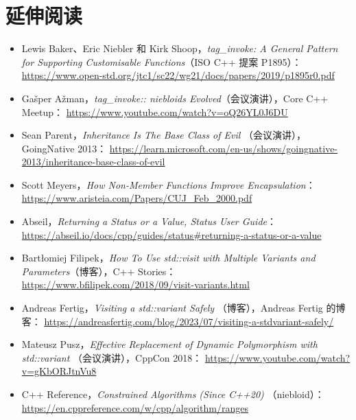 \section{延伸阅读}

\begin{itemize}
\item Lewis Baker、Eric Niebler 和 Kirk Shoop，\emph{tag\_invoke: A General Pattern for Supporting Customisable Functions}（ISO C++ 提案 P1895）： \href{https://www.open-std.org/jtc1/sc22/wg21/docs/papers/2019/p1895r0.pdf}{https://www.open-std.org/jtc1/sc22/wg21/docs/papers/2019/p1895r0.pdf}
\item Gašper Ažman，\emph{tag\_invoke:: niebloids Evolved}（会议演讲），Core C++ Meetup： \href{https://www.youtube.com/watch?v=oQ26YL0J6DU}{https://www.youtube.com/watch?v=oQ26YL0J6DU}
\item Sean Parent，\emph{Inheritance Is The Base Class of Evil }（会议演讲），GoingNative 2013： \href{https://learn.microsoft.com/en-us/shows/goingnative-2013/inheritance-base-class-of-evil }{https://learn.microsoft.com/en-us/shows/goingnative-2013/inheritance-base-class-of-evil}
\item Scott Meyers，\emph{How Non-Member Functions Improve Encapsulation}： \href{https://www.aristeia.com/Papers/CUJ_Feb_2000.pdf}{https://www.aristeia.com/Papers/CUJ\_Feb\_2000.pdf}
\item Abseil，\emph{Returning a Status or a Value, Status User Guide}： \href{https://abseil.io/docs/cpp/guides/status\#returning-a-status-or-a-value}{https://abseil.io/docs/cpp/guides/status\#returning-a-status-or-a-value}
\item Bartłomiej Filipek，\emph{How To Use std::visit with Multiple Variants and Parameters}（博客），C++ Stories： \href{https://www.bfilipek.com/2018/09/visit-variants.html}{https://www.bfilipek.com/2018/09/visit-variants.html}
\item Andreas Fertig，\emph{Visiting a std::variant Safely }（博客），Andreas Fertig 的博客： \href{https://andreasfertig.com/blog/2023/07/visiting-a-stdvariant-safely/}{https://andreasfertig.com/blog/2023/07/visiting-a-stdvariant-safely/}
\item Mateusz Pusz，\emph{Effective Replacement of Dynamic Polymorphism with std::variant }（会议演讲），CppCon 2018： \href{https://www.youtube.com/watch?v=gKbORJtnVu8}{https://www.youtube.com/watch?v=gKbORJtnVu8}
\item C++ Reference，\emph{Constrained Algorithms (Since C++20) }（niebloid）： \href{https://en.cppreference.com/w/cpp/algorithm/ranges}{https://en.cppreference.com/w/cpp/algorithm/ranges}

\end{itemize}
